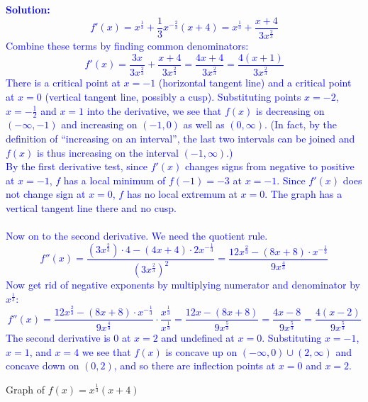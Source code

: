 \documentclass[letterpaper,11pt]{article}
\newcommand{\sol}[2]{\begin{minipage}[c][#1]{\linewidth}{\textcolor{blue}{\textbf{Solution:}}\quad \textcolor{blue}{#2}}\end{minipage}}
\newcommand{\sol}[2]{\begin{minipage}[c][#1]{\linewidth}{\vfill}\end{minipage}}
\begin{document}
\begin{enumerate}
\sol{7in}{\[f'(x)=x^{\frac{1}{3}}+\frac{1}{3}x^{-\frac{2}{3}}(x+4)=x^{\frac{1}{3}}+\frac{x+4}{3x^{\frac{2}{3}}}\]
Combine these terms by finding common denominators:
\[f'(x)=\frac{3x}{3x^{\frac{2}{3}}} +\frac{x+4}{3x^{\frac{2}{3}}} = \frac{4x+4}{3x^{\frac{2}{3}}} = \frac{4(x+1)}{3x^{\frac{2}{3}}}\]
There is a critical point at $x=-1$ (horizontal tangent line) and a critical point at $x=0$ (vertical tangent line, possibly a cusp).
Substituting points $x=-2$, $x=-\frac{1}{2}$ and $x=1$ into the derivative, we see that $f(x)$ is decreasing on $(-\infty, -1)$ and increasing on $(-1,0)$ as well as $(0, \infty)$. (In fact, by the definition of ``increasing on an interval'', the last two intervals can be joined and $f(x)$ is thus increasing on the interval $(-1, \infty)$.)\\
By the first derivative test, since $f'(x)$ changes signs from negative to positive at $x=-1$, $f$ has a local minimum of $f(-1) = -3$ at $x=-1$.  Since $f'(x)$ does not change sign at $x=0$, $f$ has no local extremum at $x=0$. The graph has a vertical tangent line there and no cusp.\\\\
Now on to the second derivative.  We need the quotient rule.
\[f''(x) = \frac{(3x^{\frac{2}{3}})\cdot 4 - (4x+4)\cdot 2x^{-\frac{1}{3}}}{(3x^{\frac{2}{3}})^2} = \frac{12x^{\frac{2}{3}} - (8x+8)\cdot x^{-\frac{1}{3}}}{9x^{\frac{4}{3}}}\]
Now get rid of negative exponents by multiplying numerator and denominator by $x^{\frac{1}{3}}$:
\[f''(x)=\frac{12x^{\frac{2}{3}} - (8x+8)\cdot x^{-\frac{1}{3}}}{9x^{\frac{4}{3}}} \cdot\frac{x^{\frac{1}{3}}}{x^{\frac{1}{3}}}=\frac{12x-(8x+8)}{9x^{\frac{5}{3}}} = \frac{4x-8}{9x^{\frac{5}{3}}}=\frac{4(x-2)}{9x^{\frac{5}{3}}}\]
The second derivative is 0 at $x=2$ and undefined at $x=0$.  Substituting $x=-1$, $x=1$, and $x=4$ we see that $f(x)$ is concave up on $(-\infty, 0)\cup(2,\infty)$ and concave down on $(0,2)$, and so there are inflection points at $x=0$ and $x=2$. }

\newpage

\begin{center}
Graph of $\displaystyle f(x) = x^{\frac{1}{3}}(x+4)$

\vspace{.1in}


\end{center}
\end{enumerate}
\end{document}
